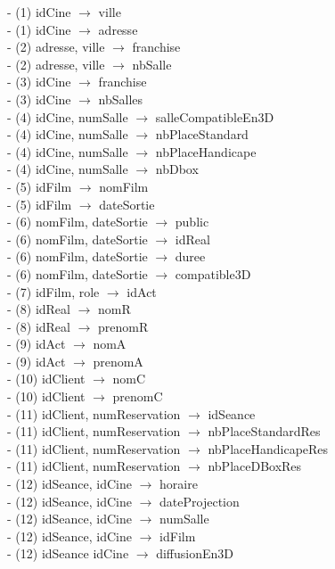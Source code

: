 \documentclass[a4paper,sffamily,12pt]{article}
\begin{document}
				\noindent- (1) idCine $\rightarrow$ ville \\
				- (1) idCine $\rightarrow$ adresse \\
				- (2) adresse, ville $\rightarrow$ franchise \\
				- (2) adresse, ville $\rightarrow$ nbSalle \\
				- (3) idCine $\rightarrow$ franchise \\
				- (3) idCine $\rightarrow$ nbSalles \\
				- (4) idCine, numSalle $\rightarrow$ salleCompatibleEn3D \\
		 		- (4) idCine, numSalle $\rightarrow$ nbPlaceStandard \\
		 		- (4) idCine, numSalle $\rightarrow$ nbPlaceHandicape \\
		 		- (4) idCine, numSalle $\rightarrow$ nbDbox \\
		 		- (5) idFilm $\rightarrow$ nomFilm \\
		 		- (5) idFilm $\rightarrow$ dateSortie \\				 		
				- (6) nomFilm, dateSortie $\rightarrow$ public \\
				- (6) nomFilm, dateSortie $\rightarrow$ idReal \\
				- (6) nomFilm, dateSortie $\rightarrow$ duree \\
				- (6) nomFilm, dateSortie $\rightarrow$ compatible3D \\
				- (7) idFilm, role $\rightarrow$ idAct \\
				- (8) idReal $\rightarrow$ nomR \\
				- (8) idReal $\rightarrow$ prenomR \\						
				- (9) idAct $\rightarrow$ nomA \\
				- (9) idAct $\rightarrow$ prenomA \\						
				- (10) idClient $\rightarrow$ nomC \\
				- (10) idClient $\rightarrow$ prenomC \\						
				- (11) idClient, numReservation $\rightarrow$ idSeance \\
				- (11) idClient, numReservation $\rightarrow$ nbPlaceStandardRes \\
				- (11) idClient, numReservation $\rightarrow$ nbPlaceHandicapeRes \\
				- (11) idClient, numReservation $\rightarrow$ nbPlaceDBoxRes \\
				- (12) idSeance, idCine $\rightarrow$ horaire \\
				- (12) idSeance, idCine $\rightarrow$ dateProjection \\
				- (12) idSeance, idCine $\rightarrow$ numSalle \\
				- (12) idSeance, idCine $\rightarrow$ idFilm \\
				- (12) idSeance  idCine $\rightarrow$ diffusionEn3D \\
		
\end{document}
